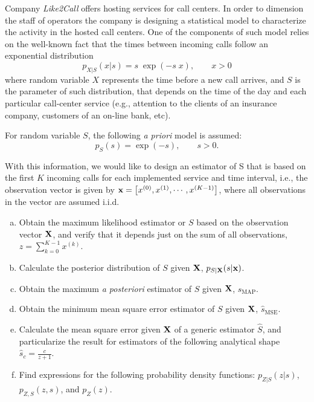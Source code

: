 \begin{prob}
\label{ProbEstLab}

Company {\em Like2Call} offers hosting services for call centers. In order to dimension the staff of operators the company is designing a statistical model to characterize the activity in the hosted call centers. One of the components of such model relies on the well-known fact that the times between incoming calls follow an exponential distribution
$$p_{X|S}(x|s) = s \; \exp(-s\; x), \qquad x>0$$
where random variable $X$ represents the time before a new call arrives, and $S$ is the parameter of such distribution, that depends on the time of the day and each particular call-center service (e.g., attention to the clients of an insurance company, customers of an on-line bank, etc). 

For random variable $S$, the following {\em a priori} model is assumed:
$$p_S(s) = \exp(-s), \qquad s>0.$$

With this information, we would like to design an estimator of S that is based on the first $K$ incoming calls for each implemented service and time interval, i.e., the observation vector is given by ${\bf x} = \left[x^{(0)}, x^{(1)}, \cdots, x^{(K-1)}\right]$, where all observations in the vector are assumed i.i.d.

\begin{enumerate}[a)]
    \item Obtain the maximum likelihood estimator or $S$ based on the observation vector $\bf X$, and verify that it depends just on the sum of all observations, $z=\sum_{k=0}^{K-1} x^{(k)}$.
    
    \item Calculate the posterior distribution of $S$ given $\bf X$, $p_{S|{\bf X}}(s|{\bf x})$.
    
    \item Obtain the maximum {\em a posteriori} estimator of $S$ given $\bf X$, ${\hat s}_\text{MAP}$.
    
    \item Obtain the minimum mean square error estimator of $S$ given $\bf X$, ${\hat s}_\text{MSE}$.
    
    \item Calculate the mean square error given ${\bf X}$ of a generic estimator $\hat S$, and particularize the result for estimators of the following analytical shape $\hat{s}_c = \frac{c}{z+1}$.

    \item Find expressions for the following probability density functions: $p_{Z|S}(z|s)$, $p_{Z,S}(z,s)$, and $p_{Z}(z)$.
    

\end{enumerate}
\end{prob}
